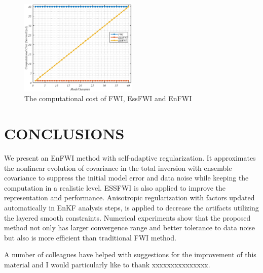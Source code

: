\documentclass[mreferee]{gji}
\begin{document}
\begin{figure}
\center
\includegraphics[width=0.5\textwidth]{fig/performance.eps}
\caption{The computational cost of FWI, EssFWI and EnFWI}
\label{fig:performance}
\end{figure}

\section{CONCLUSIONS}

We present an EnFWI method with self-adaptive regularization. It approximates the nonlinear evolution of covariance in the total inversion with ensemble covariance to suppress the initial model error and data noise while keeping the computation in a realistic level. ESSFWI is also applied to improve the representation and performance. Anisotropic regularization with factors updated automatically in EnKF analysis steps, is applied to decrease the artifacts utilizing the layered smooth constraints. Numerical experiments show that the proposed method not only has larger convergence range and better tolerance to data noise but also is  more efficient than traditional FWI method.


\begin{acknowledgments}
A number of colleagues have helped with suggestions for the
improvement of this material and I would particularly like to thank
xxxxxxxxxxxxxxx.
\end{acknowledgments}
\end{document}
